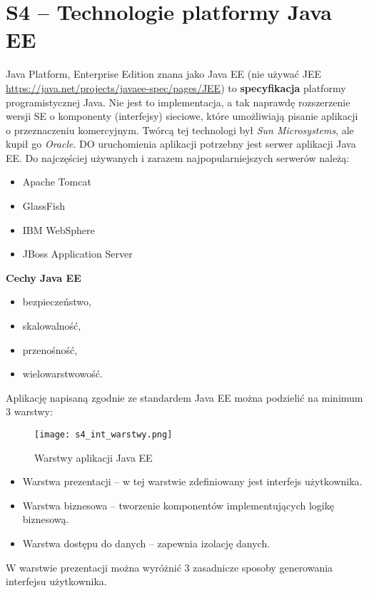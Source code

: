 \section{S4 -- Technologie platformy Java EE}

Java Platform, Enterprise Edition znana jako Java EE (nie używać JEE \url{https://java.net/projects/javaee-spec/pages/JEE}) to \textbf{specyfikacja} platformy programistycznej Java. Nie jest to implementacja, a tak naprawdę rozszerzenie wersji SE o komponenty (interfejsy) sieciowe, które umożliwiają pisanie aplikacji o przeznaczeniu komercyjnym. Twórcą tej technologi był \textit{Sun Microsystems}, ale kupił go \textit{Oracle}. 
DO uruchomienia aplikacji potrzebny jest serwer aplikacji Java EE. Do najczęściej używanych i zarazem najpopularniejszych serwerów należą:
\begin{itemize}
    \item Apache Tomcat
    \item GlassFish
    \item IBM WebSphere
    \item JBoss Application Server
\end{itemize}

\textbf{Cechy Java EE}
\begin{itemize}
    \item bezpieczeństwo,
    \item skalowalność,
    \item przenośność,
    \item wielowarstwowość.
\end{itemize}

Aplikację napisaną zgodnie ze standardem Java EE można podzielić na minimum 3 warstwy:

\begin{figure}[H]
\centering
\texttt{[image: s4\_int\_warstwy.png]}
\caption{Warstwy aplikacji Java EE}
\end{figure}

\begin{itemize}
    \item Warstwa prezentacji -- w tej warstwie zdefiniowany jest interfejs użytkownika.
    \item Warstwa biznesowa -- tworzenie komponentów implementujących logikę biznesową.
    \item Warstwa dostępu do danych -- zapewnia izolację danych. 
\end{itemize}

W warstwie prezentacji można wyróżnić 3 zasadnicze sposoby generowania interfejsu użytkownika.

